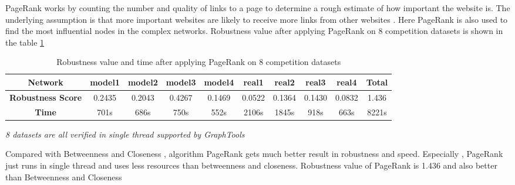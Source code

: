 \documentclass{article}
\begin{document}
	
	PageRank works by counting the number and quality of links to a page to determine a rough estimate of how important the website is. The underlying assumption is that more important websites are likely to receive more links from other websites \cite{wikiPageRank}\cite{page1999pagerank}. Here PageRank is also used to find the most influential nodes in the complex networks. Robustness value after applying PageRank on 8 competition datasets is shown in the table \ref{tab:table4}
	
	\begin{table}[!htbp]
	\begin{adjustwidth}{-1.3cm}{}		
		\begin{threeparttable}
			\centering
			\caption{Robustness value and time after applying PageRank on 8 competition datasets}
			\label{tab:table4}
			
			\begin{tabular}{|c|c|c|c|c|c|c|c|c|c|}
				\hline
				\textbf{Network}          & \textbf{model1} & \textbf{model2} & \textbf{model3} & \textbf{model4} & \textbf{real1} & \textbf{real2} & \textbf{real3} & \textbf{real4} & \textbf{Total} \\ \hline
				\textbf{Robustness Score} & 0.2435          & 0.2043          & 0.4267          & 0.1469          & 0.0522         & 0.1364         & 0.1430         & 0.0832         & 1.436          \\ \hline
				\textbf{Time}     & 701s             & 686s             & 750s             & 552s             & 2106s           & 1845s           & 918s            & 663s            & 8221s           \\ \hline							
			\end{tabular}
			\begin{tablenotes}
				\small
				\item\textit{8 datasets are all verified in single thread supported by GraphTools \cite{peixotographtool2014} }
			\end{tablenotes}			
		\end{threeparttable}
	\end{adjustwidth}
	\end{table}

		
	Compared with Betweenness and Closeness , algorithm PageRank gets much better result in robustness and speed. Especially , PageRank just runs in single thread and uses less resources than betweenness and closeness. Robustness value of PageRank is 1.436 and also better than Betweenness and Closeness 
	
\end{document}
